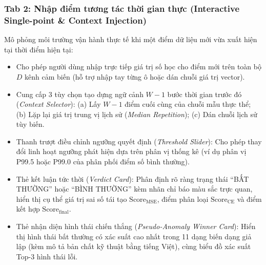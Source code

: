 \documentclass[11pt,journal,onecolumn]{IEEEtran}
\begin{document}
\subsubsection{Tab 2: Nhập điểm tương tác thời gian thực (Interactive Single-point \& Context Injection)}
Mô phỏng môi trường vận hành thực tế khi một điểm dữ liệu mới vừa xuất hiện tại thời điểm hiện tại:
\begin{itemize}
    \item Cho phép người dùng nhập trực tiếp giá trị số học cho điểm mới trên toàn bộ $D$ kênh cảm biến (hỗ trợ nhập tay từng ô hoặc dán chuỗi giá trị vector).
    \item Cung cấp 3 tùy chọn tạo dựng ngữ cảnh $W-1$ bước thời gian trước đó (\textit{Context Selector}): (a) Lấy $W-1$ điểm cuối cùng của chuỗi mẫu thực thể; (b) Lặp lại giá trị trung vị lịch sử (\textit{Median Repetition}); (c) Dán chuỗi lịch sử tùy biến.
    \item Thanh trượt điều chỉnh ngưỡng quyết định (\textit{Threshold Slider}): Cho phép thay đổi linh hoạt ngưỡng phát hiện dựa trên phân vị thống kê (ví dụ phân vị P99.5 hoặc P99.0 của phân phối điểm số bình thường).
    \item Thẻ kết luận tức thời (\textit{Verdict Card}): Phân định rõ ràng trạng thái ``BẤT THƯỜNG'' hoặc ``BÌNH THƯỜNG'' kèm nhãn chỉ báo màu sắc trực quan, hiển thị cụ thể giá trị sai số tái tạo $\text{Score}_{\text{MSE}}$, điểm phân loại $\text{Score}_{\text{CE}}$ và điểm kết hợp $\text{Score}_{\text{final}}$.
    \item Thẻ nhận diện hình thái chiến thắng (\textit{Pseudo-Anomaly Winner Card}): Hiển thị hình thái bất thường có xác suất cao nhất trong 11 dạng biến dạng giả lập (kèm mô tả bản chất kỹ thuật bằng tiếng Việt), cùng biểu đồ xác suất Top-3 hình thái lỗi.
\end{itemize}
\end{document}
